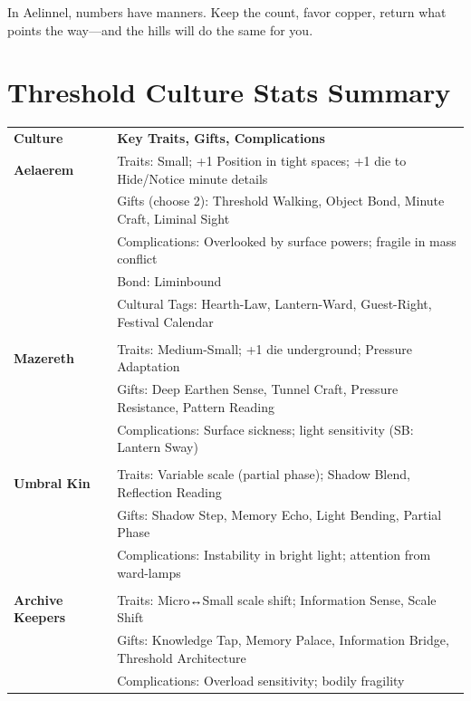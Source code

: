 \documentclass[11pt]{book}
\begin{document}
In Aelinnel, numbers have manners. Keep the count, favor copper, return what points the way---and the hills will do the same for you.

\section{Threshold Culture Stats Summary}
\begin{tabularx}{\linewidth}{>{\bfseries}lX}
\textbf{Culture} & \textbf{Key Traits, Gifts, Complications} \\
\textbf{Aelaerem} & Traits: Small; +1 Position in tight spaces; +1 die to Hide/Notice minute details \\
& Gifts (choose 2): Threshold Walking, Object Bond, Minute Craft, Liminal Sight \\
& Complications: Overlooked by surface powers; fragile in mass conflict \\
& Bond: Liminbound \\
& Cultural Tags: Hearth-Law, Lantern-Ward, Guest-Right, Festival Calendar \\
\\
\textbf{Mazereth} & Traits: Medium-Small; +1 die underground; Pressure Adaptation \\
& Gifts: Deep Earthen Sense, Tunnel Craft, Pressure Resistance, Pattern Reading \\
& Complications: Surface sickness; light sensitivity (SB: Lantern Sway) \\
\\
\textbf{Umbral Kin} & Traits: Variable scale (partial phase); Shadow Blend, Reflection Reading \\
& Gifts: Shadow Step, Memory Echo, Light Bending, Partial Phase \\
& Complications: Instability in bright light; attention from ward-lamps \\
\\
\textbf{Archive Keepers} & Traits: Micro↔Small scale shift; Information Sense, Scale Shift \\
& Gifts: Knowledge Tap, Memory Palace, Information Bridge, Threshold Architecture \\
& Complications: Overload sensitivity; bodily fragility \\
\end{tabularx}
\end{document}
